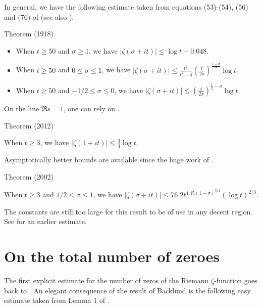 \par 
In general, we have the following estimate taken from equations
(53)-(54), (56) and (76)
of  \cite{Backlund*18}
(see also \cite{Backlund*14}).
\par 
\begin{thm}{Theorem (1918)}

  \begin{itemize}
  \item When $t\ge 50$ and $\sigma\ge1$, we have $|\zeta(\sigma+it)|\le \log
  t-0.048$.

  \item  When $t\ge 50$ and $0\le \sigma\le1$, we have $|\zeta(\sigma+it)|\le
  \frac{t^2}{t^2-4}\left(\frac{t}{2\pi}\right)^{\frac{1-\sigma}{2}}\log t$.
  

  \item  When $t\ge 50$ and $-1/2\le \sigma\le0$, we have $|\zeta(\sigma+it)|\le
  \left(\frac{t}{2\pi}\right)^{\frac{1}{2}-\sigma}\log t$.
  

  \end{itemize}
\end{thm}



On the line $\Re s=1$, one can rely on
\cite{Trudgian*12b}.
\par 
\begin{thm}{Theorem (2012)}

  When $t\ge 3$, we have $|\zeta(1+it)|\le\tfrac34 \log t$.
\end{thm}


Asymptotically better bounds are available since the huge work of
\cite{Ford*02}.
\par 
\begin{thm}{Theorem (2002)}

  When $t\ge 3$ and $1/2\le \sigma\le 1$, we have $|\zeta(\sigma+it)|\le 76.2
  t^{4.45(1-\sigma)^{3/2} } (\log t)^{2/3}$.
\end{thm}

The constants are still too large for this result to be of use in any decent
region. See \cite{Kulas*94} for an
earlier estimate.





\par 
\section{On the total number of zeroes}


The first explicit estimate for the number of zeros of the Riemann
$\zeta$-function goes back to
\cite{Backlund*14}.
An elegant consequence of the result of Backlund is the following easy
estimate taken from Lemma 1 of
\cite{Lehman*66a}.

